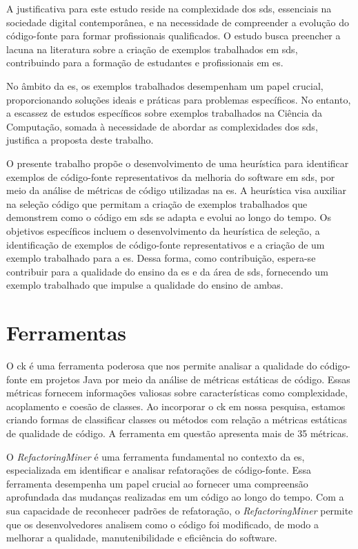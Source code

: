 A justificativa para este estudo reside na complexidade dos \gls{sds}, essenciais na sociedade digital contemporânea, e na necessidade de compreender a evolução do código-fonte para formar profissionais qualificados. O estudo busca preencher a lacuna na literatura sobre a criação de exemplos trabalhados em \gls{sds}, contribuindo para a formação de estudantes e profissionais em \gls{es}.

No âmbito da \gls{es}, os exemplos trabalhados desempenham um papel crucial, proporcionando soluções ideais e práticas para problemas específicos. No entanto, a escassez de estudos específicos sobre exemplos trabalhados na Ciência da Computação, somada à necessidade de abordar as complexidades dos \gls{sds}, justifica a proposta deste trabalho.

O presente trabalho propõe o desenvolvimento de uma heurística para identificar exemplos de código-fonte representativos da melhoria do software em \gls{sds}, por meio da análise de métricas de código utilizadas na \gls{es}. A heurística visa auxiliar na seleção código que permitam a criação de exemplos trabalhados que demonstrem como o código em \gls{sds} se adapta e evolui ao longo do tempo. Os objetivos específicos incluem o desenvolvimento da heurística de seleção, a identificação de exemplos de código-fonte representativos e a criação de um exemplo trabalhado para a \gls{es}. Dessa forma, como contribuição, espera-se contribuir para a qualidade do ensino da \gls{es} e da área de \gls{sds}, fornecendo um exemplo trabalhado que impulse a qualidade do ensino de ambas.

\section{Ferramentas}\label{sec:ferramentas}
O \gls{ck} \cite{aniche-ck} é uma ferramenta poderosa que nos permite analisar a qualidade do código-fonte em projetos Java por meio da análise de métricas estáticas de código. Essas métricas fornecem informações valiosas sobre características como complexidade, acoplamento e coesão de classes. Ao incorporar o \gls{ck} em nossa pesquisa, estamos criando formas de classificar classes ou métodos com relação a métricas estáticas de qualidade de código. A ferramenta em questão apresenta mais de 35 métricas.

O \textit{RefactoringMiner} \cite{Tsantalis:ICSE:2018:RefactoringMiner} é uma ferramenta fundamental no contexto da \gls{es}, especializada em identificar e analisar refatorações de código-fonte. Essa ferramenta desempenha um papel crucial ao fornecer uma compreensão aprofundada das mudanças realizadas em um código ao longo do tempo. Com a sua capacidade de reconhecer padrões de refatoração, o \textit{RefactoringMiner} permite que os desenvolvedores analisem como o código foi modificado, de modo a melhorar a qualidade, manutenibilidade e eficiência do software.

